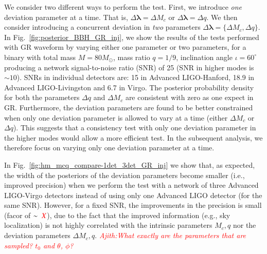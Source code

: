 \documentclass[prd,preprintnumbers,twocolumn,eqsecnum,floatfix,a4paper,nofootinbib,superscriptaddress]{revtex4}
\newcommand{\red}[1]{\textcolor{red}{#1}}
\newcommand{\ajith}[1]{\textcolor{red}{\textit{Ajith:#1}}}
\newcommand{\blambda}{\bm{\lambda}}
\begin{document}
We consider two different ways to perform the test. First, we introduce \emph{one} deviation parameter at a time. That is, $\Delta\blambda = {\Delta M_c}$ or $\Delta\blambda = {\Delta q}$. We then consider introducing a concurrent deviation in \emph{two} parameters $\Delta \blambda = \{\Delta M_c, \Delta q\}$. In Fig.~\ref{fig:posterior_BBH_GR_inj}, we show the results of the tests performed with GR waveform by varying either one parameter or two parameters, for a binary with total mass $M = 80M_{\odot}$, mass ratio $q=1/9$, inclination angle $ {\iota}=60^{\circ} $ producing a network signal-to-noise ratio  (SNR)  of 25 (SNR in higher modes is $\sim 10$). SNRs in individual detectors are: 15 in Advanced LIGO-Hanford, 18.9 in Advanced LIGO-Livingston and 6.7 in Virgo. The posterior probability density for both the parameters $\Delta q$ and $\Delta M_c$ are consistent with zero as one expect in GR. Furthermore, the deviation parameters are found to be better constrained when only one deviation parameter is allowed to vary at a time (either $\Delta M_c$ or $\Delta q$). This suggests that a consistency test with only one deviation parameter in the higher modes would allow a more efficient test. In the subsequent analysis, we therefore focus on varying only one deviation parameter at a time. 

In Fig.~\ref{fig:hm_mcq_compare-1det_3det_GR_inj} we show that, as expected, the width of the posteriors of the deviation parameters become smaller (i.e., improved precision) when we perform the test with a network of three Advanced LIGO-Virgo detectors instead of using only one Advanced LIGO detector (for the same SNR). However, for a fixed SNR, the improvements in the precision is small (facor of $\sim ~\red{X}$), due to the fact that the improved information (e.g., sky localization) is not highly correlated with the intrinsic parameters $M_c, q$ nor the deviation parameters $\Delta M_c, q$. %
\ajith{What exactly are the parameters that are sampled? $t_0$ and $\theta$, $\phi$?}
 
\end{document}
